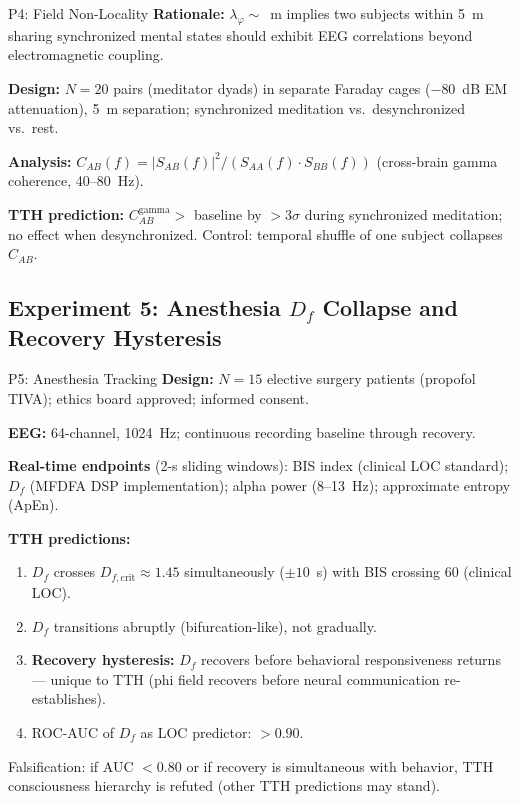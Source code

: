 \documentclass[12pt,a4paper]{article}
\numberwithin{equation}{section}
\begin{document}
\begin{protocol}{P4: Field Non-Locality}{}
\textbf{Rationale:} $\lambda_\varphi \sim$~m implies two subjects within 5~m
sharing synchronized mental states should exhibit EEG correlations
beyond electromagnetic coupling.

\textbf{Design:} $N=20$ pairs (meditator dyads) in separate Faraday cages
($-80$~dB EM attenuation), 5~m separation;
synchronized meditation vs.\ desynchronized vs.\ rest.

\textbf{Analysis:}
$C_{AB}(f) = |S_{AB}(f)|^2 / (S_{AA}(f)\cdot S_{BB}(f))$
(cross-brain gamma coherence, 40--80~Hz).

\textbf{TTH prediction:} $C_{AB}^{\mathrm{gamma}} > $ baseline by
$>3\sigma$ during synchronized meditation; no effect when desynchronized.
Control: temporal shuffle of one subject collapses $C_{AB}$.
\end{protocol}

\subsection{Experiment 5: Anesthesia $D_f$ Collapse and Recovery Hysteresis}

\begin{protocol}{P5: Anesthesia Tracking}{}
\textbf{Design:} $N=15$ elective surgery patients (propofol TIVA);
ethics board approved; informed consent.

\textbf{EEG:} 64-channel, 1024~Hz; continuous recording baseline through recovery.

\textbf{Real-time endpoints} (2-s sliding windows):
BIS index (clinical LOC standard); $D_f$ (MFDFA DSP implementation);
alpha power (8--13~Hz); approximate entropy (ApEn).

\textbf{TTH predictions:}
\begin{enumerate}[label=(\arabic*)]
\item $D_f$ crosses $D_{f,\mathrm{crit}} \approx 1.45$ simultaneously
  ($\pm 10$~s) with BIS crossing 60 (clinical LOC).
\item $D_f$ transitions abruptly (bifurcation-like), not gradually.
\item \textbf{Recovery hysteresis:} $D_f$ recovers before behavioral
  responsiveness returns --- unique to TTH (phi field recovers before
  neural communication re-establishes).
\item ROC-AUC of $D_f$ as LOC predictor: $>0.90$.
\end{enumerate}

Falsification: if AUC $< 0.80$ or if recovery is simultaneous with behavior,
TTH consciousness hierarchy is refuted (other TTH predictions may stand).
\end{protocol}
\end{document}
